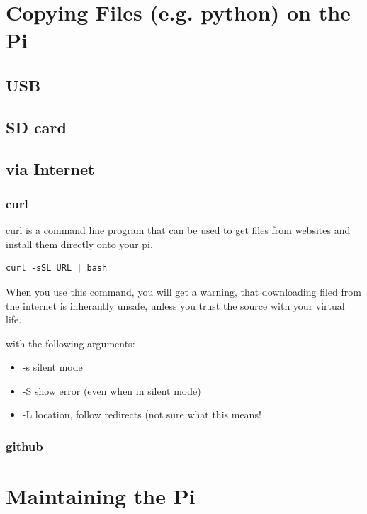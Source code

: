 \documentclass{article}\usepackage[]{graphicx}\usepackage[]{color}
\begin{document}
\section{Copying Files (e.g. python) on the Pi}

\subsection{USB}

\subsection{SD card}

\subsection{via Internet}

\subsubsection{curl}

curl is a command line program that can be used to get files from websites and install them directly onto your pi.



\begin{lstlisting}
curl -sSL URL | bash
\end{lstlisting}

When you use this command, you will get a warning, that downloading filed from the internet is inherantly unsafe, unless you trust the source with your virtual life. 

with the following arguments: 

\begin{itemize}
  \item -s silent mode
  \item -S show error (even when in silent mode)
  \item -L location, follow redirects (not sure what this means!
\end{itemize}



\subsubsection{github}


\section{Maintaining the Pi}
\end{document}
